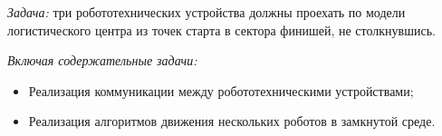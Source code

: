 
\textit{Задача:} три робототехнических устройства должны проехать по модели логистического
центра из точек старта в сектора финишей, не столкнувшись.

\textit{Включая содержательные задачи:}
\begin{itemize}
    \item Реализация коммуникации между робототехническими устройствами;
    \item Реализация алгоритмов движения нескольких роботов в замкнутой среде.
\end{itemize}

